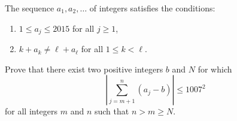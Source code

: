 The sequence $a_1,a_2,\dots$ of integers satisfies the conditions:

\begin{enumerate}[label = (\roman*)]
	\item $1\le a_j\le2015$ for all $j\ge1$, 
	\item $k+a_k\neq \ell+a_\ell$ for all $1\le k<\ell$.
\end{enumerate}

Prove that there exist two positive integers $b$ and $N$ for which\[\left\vert\sum_{j=m+1}^n(a_j-b)\right\vert\le1007^2\]for all integers $m$ and $n$ such that $n>m\ge N$.
